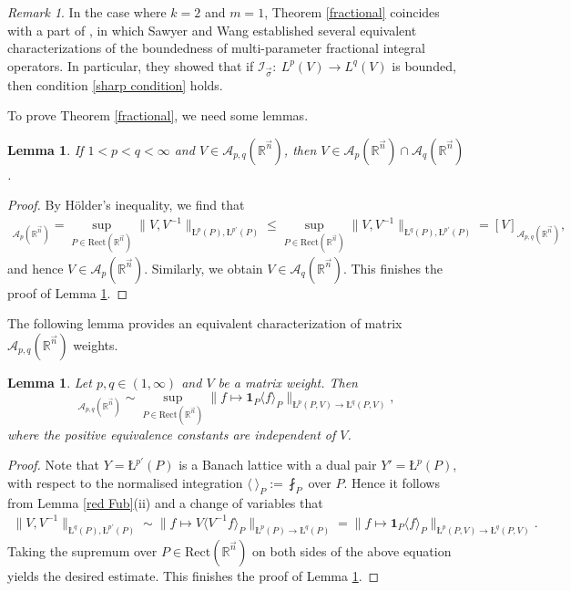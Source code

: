 \documentclass[11pt, reqno]{amsart}
\newtheorem{lemma}[theorem]{Lemma}
\theoremstyle{definition}
\theoremstyle{remark}
\newtheorem{remark}[theorem]{Remark}
\numberwithin{equation}{section}
\newcommand{\A}{\mathscr A}
\newcommand{\R}{\mathbb R}
\newcommand{\vn}{\vec n}
\newcommand{\one}{\mathbf{1}}
\newcommand{\ave}[1]{\langle #1\rangle}
\newcommand{\aveL}{\textit{\L}}
\newcommand{\Norm}[2]{\|#1\|_{#2}}
\newcommand{\Rect}{\mathrm{Rect}}
\begin{document}
\begin{remark}
In the case where $k=2$ and $m=1$,
Theorem \ref{fractional} coincides with a part of \cite[Theorem 5]{SW17},
in which Sawyer and Wang established several equivalent characterizations of the boundedness of multi-parameter fractional integral operators.
In particular, they showed that if
$\mathscr I_{\vec\sigma}:\ L^p(V)\to L^q(V)$ is bounded,
then condition \eqref{sharp condition} holds.
\end{remark}

To prove Theorem \ref{fractional}, we need some lemmas.

\begin{lemma} \label{8.19}
If $1<p<q<\infty$ and $V\in \A_{p,q}(\R^{\vn})$,
then $V\in \A_p(\R^{\vn}) \cap \A_q(\R^{\vn})$.
\end{lemma}

\begin{proof}
By H\"older's inequality, we find that
\begin{align*}
[V]_{\A_p(\mathbb R^{\vec n})}
=\sup_{P\in\Rect(\mathbb R^{\vec n})}
\|V,V^{-1}\|_{\aveL^{p}(P),\aveL^{p'}(P)}
\leq\sup_{P\in\Rect(\mathbb R^{\vec n})}
\|V,V^{-1}\|_{\aveL^q(P),\aveL^{p'}(P)}
=[V]_{\A_{p,q}(\mathbb R^{\vec n})},
\end{align*}
and hence $V\in \A_p(\mathbb R^{\vec n})$.
Similarly, we obtain $V\in \A_q(\mathbb R^{\vec n})$.
This finishes the proof of Lemma \ref{8.19}.
\end{proof}

The following lemma provides an equivalent characterization of matrix $\A_{p,q}(\mathbb R^{\vec n})$ weights.

\begin{lemma} \label{op-norm}
Let $p,q\in(1,\infty)$ and $V$ be a matrix weight.
Then
\begin{equation*}
[V]_{\A_{p,q}(\mathbb R^{\vec n})}
\sim\sup_{P\in\Rect(\mathbb R^{\vec n})}
\Norm{f\mapsto\one_P\ave{f}_P}{\aveL^{p}(P,V)\to\aveL^q(P,V)},
\end{equation*}
where the positive equivalence constants are independent of $V$.
\end{lemma}

\begin{proof}
Note that $Y=\aveL^{p'}(P)$ is a Banach lattice with a dual pair $Y'=\aveL^p(P)$, with respect to the normalised integration $\ave{\ }_P:=\fint_P$ over $P$.
Hence it follows from Lemma \ref{red Fub}(ii) and a change of variables that
\begin{align*}
\Norm{V,V^{-1}}{\aveL^q(P),\aveL^{p'}(P)}
\sim \Norm{f\mapsto V\ave{V^{-1}f}_P}{\aveL^{p}(P)\to\aveL^q(P)}
=\Norm{f\mapsto \one_P\ave{f}_P}{\aveL^{p}(P,V)\to\aveL^q(P,V)}.
\end{align*}
Taking the supremum over $P\in\Rect(\mathbb R^{\vec n})$ on both sides of
the above equation yields the desired estimate.
This finishes the proof of Lemma \ref{op-norm}.
\end{proof}
\end{document}
